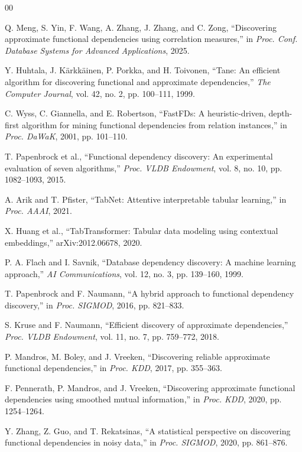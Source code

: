 \documentclass[conference]{IEEEtran}
\begin{document}
\begin{thebibliography}{00}

Q. Meng, S. Yin, F. Wang, A. Zhang, J. Zhang, and C. Zong, ``Discovering approximate functional dependencies using correlation measures,'' in \textit{Proc. Conf. Database Systems for Advanced Applications}, 2025.

Y. Huhtala, J. K\"arkk\"ainen, P. Porkka, and H. Toivonen, ``Tane: An efficient algorithm for discovering functional and approximate dependencies,'' \textit{The Computer Journal}, vol. 42, no. 2, pp. 100--111, 1999.

C. Wyss, C. Giannella, and E. Robertson, ``FastFDs: A heuristic-driven, depth-first algorithm for mining functional dependencies from relation instances,'' in \textit{Proc. DaWaK}, 2001, pp. 101--110.

T. Papenbrock et al., ``Functional dependency discovery: An experimental evaluation of seven algorithms,'' \textit{Proc. VLDB Endowment}, vol. 8, no. 10, pp. 1082--1093, 2015.

A. Arik and T. Pfister, ``TabNet: Attentive interpretable tabular learning,'' in \textit{Proc. AAAI}, 2021.

X. Huang et al., ``TabTransformer: Tabular data modeling using contextual embeddings,'' arXiv:2012.06678, 2020.

P. A. Flach and I. Savnik, ``Database dependency discovery: A machine learning approach,'' \textit{AI Communications}, vol. 12, no. 3, pp. 139--160, 1999.

T. Papenbrock and F. Naumann, ``A hybrid approach to functional dependency discovery,'' in \textit{Proc. SIGMOD}, 2016, pp. 821--833.

S. Kruse and F. Naumann, ``Efficient discovery of approximate dependencies,'' \textit{Proc. VLDB Endowment}, vol. 11, no. 7, pp. 759--772, 2018.

P. Mandros, M. Boley, and J. Vreeken, ``Discovering reliable approximate functional dependencies,'' in \textit{Proc. KDD}, 2017, pp. 355--363.

F. Pennerath, P. Mandros, and J. Vreeken, ``Discovering approximate functional dependencies using smoothed mutual information,'' in \textit{Proc. KDD}, 2020, pp. 1254--1264.

Y. Zhang, Z. Guo, and T. Rekatsinas, ``A statistical perspective on discovering functional dependencies in noisy data,'' in \textit{Proc. SIGMOD}, 2020, pp. 861--876.


\end{thebibliography}
\end{document}
